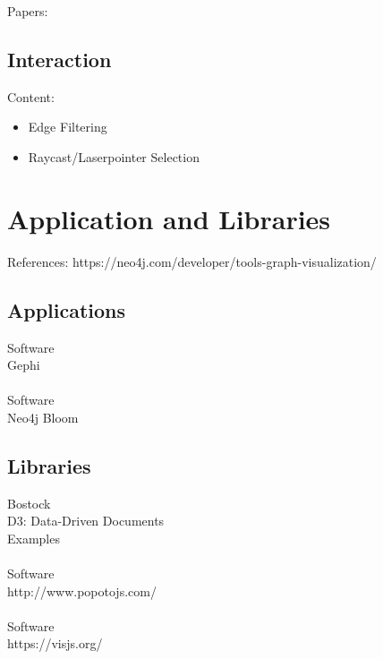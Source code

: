 Papers: \\

\subsection{Interaction}
Content: 
\begin{itemize}
    \item Edge Filtering
    \item Raycast/Laserpointer Selection
\end{itemize}

\section{Application and Libraries}
References: https://neo4j.com/developer/tools-graph-visualization/

\subsection{Applications}
Software\\
Gephi\\
\\
Software\\
Neo4j Bloom\\
\subsection{Libraries}
Bostock\\
D3: Data-Driven Documents\\
Examples\\
\\
Software\\
http://www.popotojs.com/ \\
\\
Software\\
https://visjs.org/